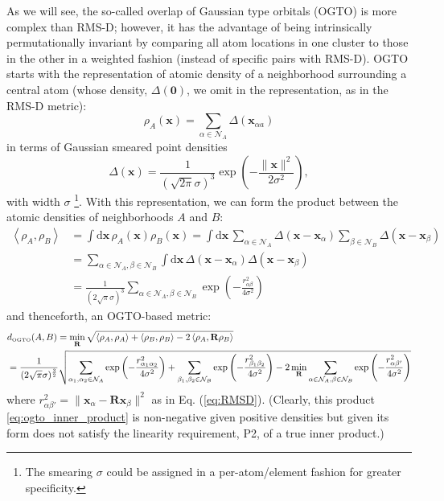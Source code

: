 \documentclass[journal=jctcce,manuscript=article]{achemso}
\newcommand{\eref}[1]{{Eq. (\ref{#1})}}
\newcommand{\xb}{\mathbf{x}}
\newcommand{\Rb}{\mathbf{R}}
\newcommand{\Nc}{\mathcal{N}}
\begin{document}
As we will see, the so-called overlap of Gaussian type orbitals (OGTO) is more complex than RMS-D; however, it has the advantage of being intrinsically permutationally invariant by comparing all atom locations in one cluster to those in the other in a weighted fashion (instead of specific pairs with RMS-D).
OGTO starts with the representation of atomic density of a neighborhood surrounding a central atom (whose density, $\Delta(\mathbf{0})$, we omit in the representation, as in the RMS-D metric):
\begin{equation} \label{eq:sph_harm_expansion}
\rho_A(\xb) = 
\sum_{\alpha\in\Nc_A} \Delta(\xb_{\alpha  a}) 
\end{equation}
in terms of Gaussian smeared point densities 
\begin{equation}
 \Delta(\xb) = \frac{1}{(\sqrt{2 \pi} \sigma)^{3}} \exp\left(- \frac{ \| \xb \|^2}{2\sigma^2}\right) ,
\end{equation}
with width $\sigma$
\footnote{The smearing $\sigma$ could be assigned in a per-atom/element fashion for greater specificity.}.
With this representation, we can form the product 
between the atomic densities of neighborhoods $A$ and $B$:
\begin{equation} \label{eq:ogto_inner_product}
\begin{split}
\left<\rho_A,\rho_B\right> &= \int \mathrm{d}\xb \,  \rho_A(\xb) \rho_B(\xb)
=  \int \mathrm{d}\xb \, \sum_{\alpha\in\Nc_A} \Delta(\xb-\xb_\alpha) \sum_{\beta\in\Nc_B} \Delta(\xb-\xb_\beta) \\
&= \sum_{\alpha \in \Nc_A,\beta \in \Nc_B}  \int \mathrm{d}\xb \, \Delta(\xb-\xb_\alpha) \Delta(\xb-\xb_\beta)  \\
&= \frac{1}{(2 \sqrt{\pi} \sigma)^3} \sum_{\alpha\in\Nc_A,\beta\in\Nc_B} \exp\left( -\frac{r_{\alpha\beta}^2}{4 \sigma^2} \right)
\end{split}
\end{equation}
and thenceforth, an OGTO-based metric: 
\begin{equation} \label{eq:ogto_norm}
\begin{split}
&d_\text{\tiny{OGTO}}(A,B)  
= \min_\Rb \sqrt{ \left<\rho_A, \rho_A\right> + \left<\rho_B,\rho_B\right> - 2 \left<\rho_A,\Rb \rho_B\right>} \\
&= \frac{1}{(2 \sqrt{\pi} \sigma)^{\frac{3}{2}}} \sqrt{
\sum_{\alpha_1,\alpha_2\in\Nc_A}  \exp\left( -\frac{r_{\alpha_1\alpha_2}^2}{4 \sigma^2} \right)
+
\sum_{\beta_1,\beta_2\in\Nc_B}    \exp\left( -\frac{r_{\beta_1\beta_2}^2}{4 \sigma^2} \right)
-2 \min_\Rb
\sum_{\alpha\in\Nc_A,\beta\in\Nc_B}       \exp\left( -\frac{r_{\alpha\beta'}^2}{4 \sigma^2} \right)
} 
\end{split}
\end{equation}
where $r^2_{\alpha\beta'} = \|\xb_\alpha - \Rb \xb_\beta\|^2$ as in \eref{eq:RMSD}.
(Clearly, this product \eqref{eq:ogto_inner_product} is non-negative given positive densities but given its form does not satisfy the linearity requirement, P2, of a true inner product.)
\end{document}
